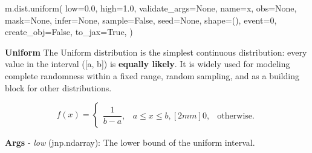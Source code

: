 \documentclass[
  letterpaper,
  DIV=11,
  numbers=noendperiod]{scrartcl}
\newenvironment{Shaded}{\begin{snugshade}}{\end{snugshade}}
\newcommand{\DecValTok}[1]{\textcolor[rgb]{0.68,0.00,0.00}{#1}}
\newcommand{\FloatTok}[1]{\textcolor[rgb]{0.68,0.00,0.00}{#1}}
\newcommand{\NormalTok}[1]{\textcolor[rgb]{0.00,0.23,0.31}{#1}}
\newcommand{\OperatorTok}[1]{\textcolor[rgb]{0.37,0.37,0.37}{#1}}
\newcommand{\StringTok}[1]{\textcolor[rgb]{0.13,0.47,0.30}{#1}}
\newcommand{\VariableTok}[1]{\textcolor[rgb]{0.07,0.07,0.07}{#1}}
\begin{document}
\begin{Shaded}
\begin{Highlighting}[]
\NormalTok{m.dist.uniform(}
\NormalTok{    low}\OperatorTok{=}\FloatTok{0.0}\NormalTok{,}
\NormalTok{    high}\OperatorTok{=}\FloatTok{1.0}\NormalTok{,}
\NormalTok{    validate\_args}\OperatorTok{=}\VariableTok{None}\NormalTok{,}
\NormalTok{    name}\OperatorTok{=}\StringTok{\textquotesingle{}x\textquotesingle{}}\NormalTok{,}
\NormalTok{    obs}\OperatorTok{=}\VariableTok{None}\NormalTok{,}
\NormalTok{    mask}\OperatorTok{=}\VariableTok{None}\NormalTok{,}
\NormalTok{    infer}\OperatorTok{=}\VariableTok{None}\NormalTok{,}
\NormalTok{    sample}\OperatorTok{=}\VariableTok{False}\NormalTok{,}
\NormalTok{    seed}\OperatorTok{=}\VariableTok{None}\NormalTok{,}
\NormalTok{    shape}\OperatorTok{=}\NormalTok{(),}
\NormalTok{    event}\OperatorTok{=}\DecValTok{0}\NormalTok{,}
\NormalTok{    create\_obj}\OperatorTok{=}\VariableTok{False}\NormalTok{,}
\NormalTok{    to\_jax}\OperatorTok{=}\VariableTok{True}\NormalTok{,}
\NormalTok{)}
\end{Highlighting}
\end{Shaded}

\textbf{Uniform} The Uniform distribution is the simplest continuous
distribution: every value in the interval ({[}a, b{]}) is
\textbf{equally likely}. It is widely used for modeling complete
randomness within a fixed range, random sampling, and as a building
block for other distributions.

\[   
f(x) =
\begin{cases}
\dfrac{1}{b - a}, & a \le x \le b, [2mm]
0, & \text{otherwise}.
\end{cases}
\]

\textbf{Args} - \emph{low} (jnp.ndarray): The lower bound of the uniform
interval.
\end{document}
